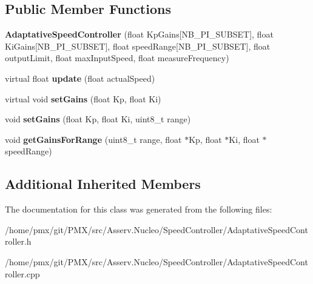 \subsection*{Public Member Functions}
\begin{DoxyCompactItemize}
\item 
\mbox{\label{classAdaptativeSpeedController_a063f846ce54320852e2f5f5eb72d2565}} 
{\bfseries Adaptative\+Speed\+Controller} (float Kp\+Gains\mbox{[}N\+B\+\_\+\+P\+I\+\_\+\+S\+U\+B\+S\+ET\mbox{]}, float Ki\+Gains\mbox{[}N\+B\+\_\+\+P\+I\+\_\+\+S\+U\+B\+S\+ET\mbox{]}, float speed\+Range\mbox{[}N\+B\+\_\+\+P\+I\+\_\+\+S\+U\+B\+S\+ET\mbox{]}, float output\+Limit, float max\+Input\+Speed, float measure\+Frequency)
\item 
\mbox{\label{classAdaptativeSpeedController_a8407b1119145b01c802dd067d75212a3}} 
virtual float {\bfseries update} (float actual\+Speed)
\item 
\mbox{\label{classAdaptativeSpeedController_a8a6f7908d8005c4e6754da209e73a211}} 
virtual void {\bfseries set\+Gains} (float Kp, float Ki)
\item 
\mbox{\label{classAdaptativeSpeedController_a0fe0e00fffc399447d992c380058f12d}} 
void {\bfseries set\+Gains} (float Kp, float Ki, uint8\+\_\+t range)
\item 
\mbox{\label{classAdaptativeSpeedController_ac8af86bb85d628a10153d807dee548bb}} 
void {\bfseries get\+Gains\+For\+Range} (uint8\+\_\+t range, float $\ast$Kp, float $\ast$Ki, float $\ast$speed\+Range)
\end{DoxyCompactItemize}
\subsection*{Additional Inherited Members}


The documentation for this class was generated from the following files\+:\begin{DoxyCompactItemize}
\item 
/home/pmx/git/\+P\+M\+X/src/\+Asserv.\+Nucleo/\+Speed\+Controller/Adaptative\+Speed\+Controller.\+h\item 
/home/pmx/git/\+P\+M\+X/src/\+Asserv.\+Nucleo/\+Speed\+Controller/Adaptative\+Speed\+Controller.\+cpp\end{DoxyCompactItemize}
